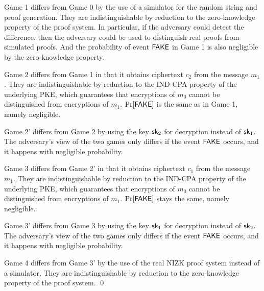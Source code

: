 Game 1 differs from Game 0 by the use of a simulator for the random string and proof generation.
They are indistinguishable by reduction to the zero-knowledge property of the proof system.
In particular, if the adversary could detect the difference, then the adversary could be used to distinguish real proofs from simulated proofs.
And the probability of event $\mathsf{FAKE}$ in Game 1 is also negligible by the
zero-knowledge property.

Game 2 differs from Game 1 in that it obtains ciphertext $c_2$ from the message $m_1$.
They are indistinguishable by reduction to the IND-CPA property of the underlying PKE,
which guarantees that encryptions of $m_0$ cannot be distinguished from encryptions of $m_1$.
$\Pr[\mathsf{FAKE}]$ is the same as in Game 1, namely negligible.

Game 2' differs from Game 2 by using the key $\mathsf{sk}_2$ for decryption instead of $\mathsf{sk}_1$.
The adversary's view of the two games only differs if the event $\mathsf{FAKE}$ occurs, and it happens with
negligible probability.

Game 3 differs from Game 2' in that it obtains ciphertext $c_1$ from the message $m_1$.
They are indistinguishable by reduction to the IND-CPA property of the underlying PKE,
which guarantees that encryptions of $m_0$ cannot be distinguished from encryptions of $m_1$.
$\Pr[\mathsf{FAKE}]$ stays the same, namely negligible.

Game 3' differs from Game 3 by using the key $\mathsf{sk}_1$ for decryption instead of $\mathsf{sk}_2$.
The adversary's view of the two games only differs if the event $\mathsf{FAKE}$ occurs, and it happens with
negligible probability.

Game 4 differs from Game 3' by the use of the real NIZK proof system instead of a simulator.
They are indistinguishable by reduction to the zero-knowledge property of the proof system.
\qed


